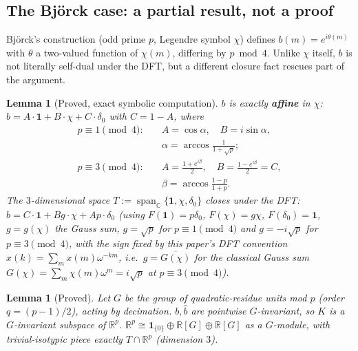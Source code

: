 \documentclass[11pt]{article}
\theoremstyle{plain}
\newtheorem{lemma}[theorem]{Lemma}
\theoremstyle{definition}
\theoremstyle{remark}
\newcommand{\R}{\mathbb R}
\newcommand{\C}{\mathbb C}
\begin{document}
\subsection{The Bj\"orck case: a partial result, not a proof}

Björck's construction (odd prime $p$, Legendre symbol $\chi$)
\cite{Bjorck90} defines $b(m)=e^{i\theta(m)}$ with $\theta$ a two-valued
function of $\chi(m)$, differing by $p\bmod4$. Unlike $\chi$ itself, $b$
is not literally self-dual under the DFT, but a different closure fact
rescues part of the argument.

\begin{lemma}[Proved, exact symbolic computation]\label{lem:bjaffine}
$b$ is exactly \textbf{affine} in $\chi$: $b=A\cdot\mathbf1+B\cdot\chi+C\cdot\delta_0$
with $C=1-A$, where
\[
\begin{aligned}
p\equiv1\pmod4:\quad
 &A=\cos\alpha,\quad B=i\sin\alpha,\\
 &\alpha=\arccos\frac1{1+\sqrt p};\\
p\equiv3\pmod4:\quad
 &A=\frac{1+e^{i\beta}}2,\quad B=\frac{1-e^{i\beta}}2=C,\\
 &\beta=\arccos\frac{1-p}{1+p}.
\end{aligned}
\]
The $3$-dimensional space $T:=\operatorname{span}_\C\{\mathbf1,\chi,\delta_0\}$
closes under the DFT: $\hat b=C\cdot\mathbf1+Bg\cdot\chi+Ap\cdot\delta_0$
(using $F(\mathbf1)=p\delta_0$, $F(\chi)=g\chi$, $F(\delta_0)=\mathbf1$,
$g=g(\chi)$ the Gauss sum, $g=\sqrt p$ for $p\equiv1\pmod4$ and $g=-i\sqrt p$
for $p\equiv3\pmod4$, with the sign fixed by this paper's DFT convention
$\hat x(k)=\sum_mx(m)\omega^{-km}$, i.e.\ $g=\overline{G(\chi)}$ for the
classical Gauss sum $G(\chi)=\sum_m\chi(m)\omega^m=i\sqrt p$ at
$p\equiv3\pmod4$).
\end{lemma}

\begin{lemma}[Proved]\label{lem:bjequiv}
Let $G$ be the group of quadratic-residue units mod $p$ (order $q=(p-1)/2$),
acting by decimation. $b,\hat b$ are pointwise $G$-invariant, so $K$ is a
$G$-invariant subspace of $\R^p$. $\R^p\cong\mathbf1_{\{0\}}\oplus\R[G]\oplus\R[G]$
as a $G$-module, with trivial-isotypic piece exactly $T\cap\R^p$
(dimension $3$).
\end{lemma}
\end{document}
